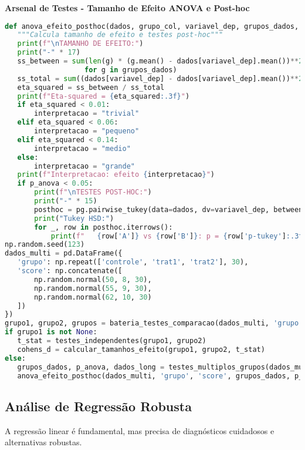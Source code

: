 \begin{examplebox}
\textbf{Arsenal de Testes - Tamanho de Efeito ANOVA e Post-hoc}
\begin{lstlisting}[language=Python]
def anova_efeito_posthoc(dados, grupo_col, variavel_dep, grupos_dados, p_anova):
   """Calcula tamanho de efeito e testes post-hoc"""
   print(f"\nTAMANHO DE EFEITO:")
   print("-" * 17)
   ss_between = sum(len(g) * (g.mean() - dados[variavel_dep].mean())**2 
                   for g in grupos_dados)
   ss_total = sum((dados[variavel_dep] - dados[variavel_dep].mean())**2)
   eta_squared = ss_between / ss_total
   print(f"Eta-squared = {eta_squared:.3f}")
   if eta_squared < 0.01:
       interpretacao = "trivial"
   elif eta_squared < 0.06:
       interpretacao = "pequeno"
   elif eta_squared < 0.14:
       interpretacao = "medio"
   else:
       interpretacao = "grande"
   print(f"Interpretacao: efeito {interpretacao}")
   if p_anova < 0.05:
       print(f"\nTESTES POST-HOC:")
       print("-" * 15)
       posthoc = pg.pairwise_tukey(data=dados, dv=variavel_dep, between=grupo_col)
       print("Tukey HSD:")
       for _, row in posthoc.iterrows():
           print(f"   {row['A']} vs {row['B']}: p = {row['p-tukey']:.3f}")
np.random.seed(123)
dados_multi = pd.DataFrame({
   'grupo': np.repeat(['controle', 'trat1', 'trat2'], 30),
   'score': np.concatenate([
       np.random.normal(50, 8, 30),
       np.random.normal(55, 9, 30),
       np.random.normal(62, 10, 30)
   ])
})
grupo1, grupo2, grupos = bateria_testes_comparacao(dados_multi, 'grupo', 'score')
if grupo1 is not None:
   t_stat = testes_independentes(grupo1, grupo2)
   cohens_d = calcular_tamanhos_efeito(grupo1, grupo2, t_stat)
else:
   grupos_dados, p_anova, dados_long = testes_multiplos_grupos(dados_multi, 'grupo', 'score')
   anova_efeito_posthoc(dados_multi, 'grupo', 'score', grupos_dados, p_anova)
\end{lstlisting}
\end{examplebox}

\subsection{Análise de Regressão Robusta}

A regressão linear é fundamental, mas precisa de diagnósticos cuidadosos e alternativas robustas.

